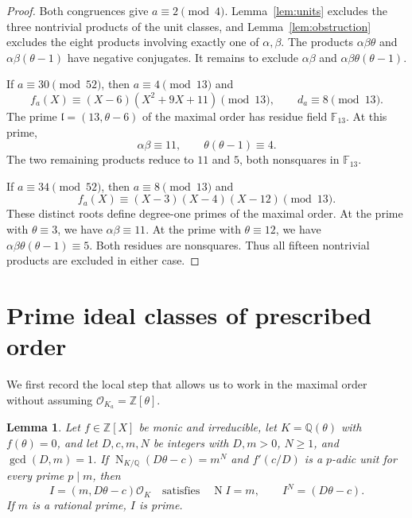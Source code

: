 \documentclass[11pt,leqno,oneside,letterpaper]{amsart}
\newtheorem{lemma}[theorem]{Lemma}
\theoremstyle{remark}
\numberwithin{equation}{section}
\newcommand{\Q}{\mathbb Q}
\newcommand{\Z}{\mathbb Z}
\newcommand{\F}{\mathbb F}
\DeclareMathOperator{\Nm}{N}
\begin{document}
\begin{proof}
  Both congruences give $a\equiv2\pmod4$. Lemma~\ref{lem:units} excludes the three nontrivial products of the unit classes, and Lemma~\ref{lem:obstruction} excludes the eight products involving exactly one of $\alpha,\beta$. The products $\alpha\beta\theta$ and $\alpha\beta(\theta-1)$ have negative conjugates. It remains to exclude $\alpha\beta$ and $\alpha\beta\theta(\theta-1)$.

  If $a\equiv30\pmod{52}$, then $a\equiv4\pmod{13}$ and
  \[
    f_a(X)\equiv(X-6)(X^2+9X+11)\pmod{13},\qquad d_a\equiv8\pmod{13}.
  \]
  The prime $\mathfrak l=(13,\theta-6)$ of the maximal order has residue field $\F_{13}$. At this prime,
  \[
    \alpha\beta\equiv11,\qquad \theta(\theta-1)\equiv4.
  \]
  The two remaining products reduce to $11$ and $5$, both nonsquares in $\F_{13}$.

  If $a\equiv34\pmod{52}$, then $a\equiv8\pmod{13}$ and
  \[
    f_a(X)\equiv(X-3)(X-4)(X-12)\pmod{13}.
  \]
  These distinct roots define degree-one primes of the maximal order. At the prime with $\theta\equiv3$, we have $\alpha\beta\equiv11$. At the prime with $\theta\equiv12$, we have $\alpha\beta\theta(\theta-1)\equiv5$. Both residues are nonsquares. Thus all fifteen nontrivial products are excluded in either case.
\end{proof}

\section{Prime ideal classes of prescribed order}

We first record the local step that allows us to work in the maximal order without assuming $\mathcal O_{K_a}=\Z[\theta]$.

\begin{lemma}\label{lem:local-power}
  Let $f\in\Z[X]$ be monic and irreducible, let $K=\Q(\theta)$ with $f(\theta)=0$, and let $D,c,m,N$ be integers with $D,m>0$, $N\geq1$, and $\gcd(D,m)=1$. If $\Nm_{K/\Q}(D\theta-c)=m^N$ and $f'(c/D)$ is a $p$-adic unit for every prime $p\mid m$, then
  \[
    I=(m,D\theta-c)\mathcal O_K
    \quad\text{satisfies}\quad \Nm I=m,\qquad I^N=(D\theta-c).
  \]
  If $m$ is a rational prime, $I$ is prime.
\end{lemma}
\end{document}
